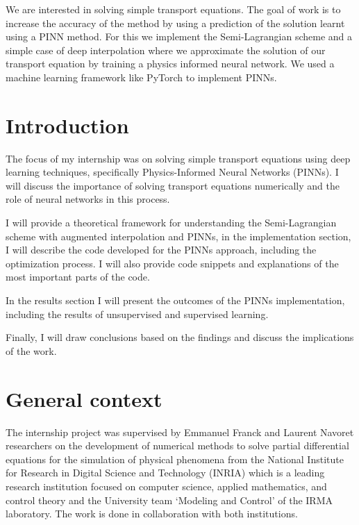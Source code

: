 \documentclass{article}
\begin{document}
We are interested in solving simple transport equations. The goal of work is to increase the accuracy of the method by using a prediction of the solution learnt using a PINN method.
For this we implement the Semi-Lagrangian scheme and a simple case of deep interpolation where we approximate the solution of our transport equation by training a physics informed neural network.
We used a machine learning framework like PyTorch to implement PINNs. 

\section{Introduction}
The focus of my internship was on solving simple transport equations using deep learning techniques, specifically Physics-Informed Neural Networks (PINNs). I will discuss the importance of solving transport equations numerically and the role of neural networks in this process.

I will provide a theoretical framework for understanding the Semi-Lagrangian scheme with augmented interpolation and PINNs, in the implementation section, I will describe the code developed for the PINNs approach, including the optimization process. I will also provide code snippets and explanations of the most important parts of the code.

In the results section I will present the outcomes of the PINNs implementation, including the results of unsupervised and supervised learning.

Finally, I will draw conclusions based on the findings and discuss the implications of the work.

\newpage

\section{General context}

The internship project was supervised by Emmanuel Franck and Laurent Navoret researchers on the development of numerical methods to solve partial differential equations 
for the simulation of physical phenomena from the National Institute for Research in Digital Science and Technology (INRIA) which is a leading research institution focused on computer science, applied mathematics, and control theory and the University team ‘Modeling and Control’ of the IRMA laboratory.
The work is done in collaboration with both institutions. 
\end{document}
